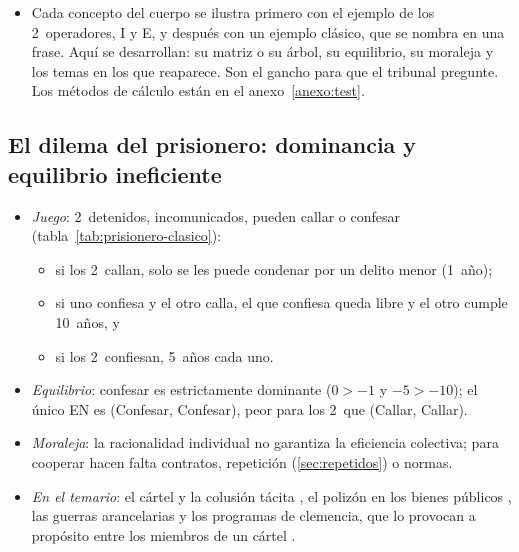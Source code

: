 \documentclass[11pt]{article}
\begin{document}
\begin{itemize}
\item Cada concepto del cuerpo se ilustra primero con el ejemplo de los 2~operadores, \textup{I} y E, y después con un ejemplo clásico, que se nombra en una frase. Aquí se desarrollan: su matriz o su árbol, su equilibrio, su moraleja y los temas en los que reaparece. Son el gancho para que el tribunal pregunte. Los métodos de cálculo están en el anexo~\ref{anexo:test}.
\end{itemize}

\subsection*{El dilema del prisionero: dominancia y equilibrio ineficiente}

\begin{itemize}
\item \emph{Juego}\nocite{Tucker1950TwoPerson}: 2~detenidos, incomunicados, pueden callar o confesar (tabla~\ref{tab:prisionero-clasico}):
  \begin{itemize}
  \item si los 2~callan, solo se les puede condenar por un delito menor (1~año);
  \item si uno confiesa y el otro calla, el que confiesa queda libre y el otro cumple 10~años, y
  \item si los 2~confiesan, 5~años cada uno.
  \end{itemize}
\item \emph{Equilibrio}: confesar es estrictamente dominante ($0>-1$ y $-5>-10$); el único EN es (Confesar, Confesar), peor para los 2~que (Callar, Callar).
\item \emph{Moraleja}: la racionalidad individual no garantiza la eficiencia colectiva; para cooperar hacen falta contratos, repetición (\ref{sec:repetidos}) o normas.
\item \emph{En el temario}: el cártel y la colusión tácita , el polizón en los bienes públicos , las guerras arancelarias  y los programas de clemencia, que lo provocan a propósito entre los miembros de un cártel .
\end{itemize}
\end{document}
